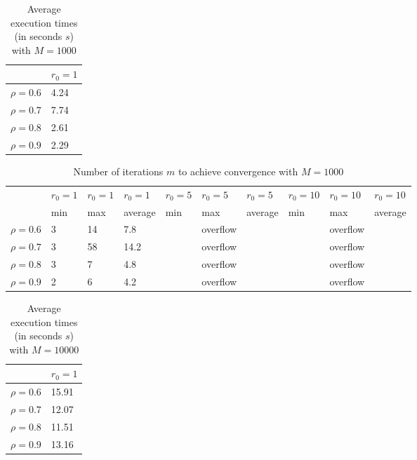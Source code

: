 \documentclass[a4paper,11pt,openright]{report}
\begin{document}
\begin{table}[H]
\centering
\addtolength{\leftskip}{-1.5cm}
\addtolength{\rightskip}{-1.5cm}
\begin{tabular}{|c|l|}
\hline
$ $ & $r_0 = 1$   \\
\hline
$\rho = 0.6$ & 4.24 \\

$\rho = 0.7$ & 7.74 \\

$\rho = 0.8$ & 2.61 \\

$\rho = 0.9$ & 2.29 \\
\hline
\end{tabular}
\caption{Average execution
 times (in seconds $s$) with $M = 1000$}
\end{table}
\begin{table}[H]
\centering
\addtolength{\leftskip}{-1.5cm}
\addtolength{\rightskip}{-1.5cm}
\begin{tabular}{|c|lllllllll|}
\hline
$ $ & $r_0 = 1$ & $r_0 = 1$ & $r_0 = 1$ & $r_0 = 5$ & $r_0 = 5$ & $r_0 = 5$ & $r_0 = 10$ & $r_0 = 10$ & $r_0 = 10$  \\
$ $ & min & max & average & min & max & average & min & max & average \\ 
\hline
$\rho = 0.6$ & 3 & 14 & 7.8 &  & overflow &  &  & overflow &  \\

$\rho = 0.7$ & 3 & 58 & 14.2 &  & overflow &  &  & overflow &  \\

$\rho = 0.8$ & 3 & 7 & 4.8 &  & overflow &  &  & overflow & \\

$\rho = 0.9$ & 2 & 6 & 4.2 &  & overflow &  &  & overflow & \\
\hline
\end{tabular}
\caption{Number of iterations $m$ to achieve convergence with $M = 1000$}
\end{table}
\begin{table}[H]
\centering
\addtolength{\leftskip}{-1.5cm}
\addtolength{\rightskip}{-1.5cm}
\begin{tabular}{|c|l|}
\hline
$ $ & $r_0 = 1$   \\
\hline
$\rho = 0.6$ & 15.91 \\

$\rho = 0.7$ & 12.07 \\

$\rho = 0.8$ & 11.51 \\

$\rho = 0.9$ & 13.16 \\
\hline
\end{tabular}
\caption{Average execution
 times (in seconds $s$) with $M = 10000$}
\end{table}
\end{document}
